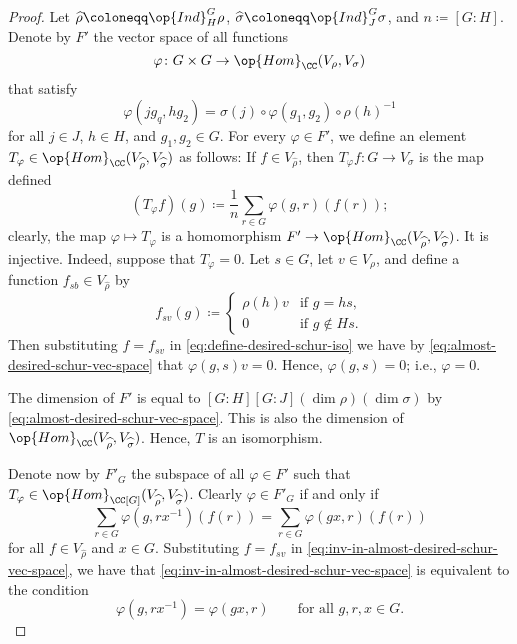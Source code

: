 \documentclass[../main.tex]{subfiles}
\begin{document}
\begin{proof}
	Let $\widehat\rho\coloneqq\op{Ind}^G_H\rho$, $\widehat\sigma\coloneqq\op{Ind}^G_J\sigma$, and $n\coloneqq[G:H]$. Denote by $F'$ the vector space of all functions
	\[\varphi\colon G\times G\to\op{Hom}_\CC(V_\rho,V_\sigma)\]
	that satisfy
	\begin{equation}
		\varphi(jg_q,hg_2) = \sigma(j)\circ\varphi(g_1,g_2)\circ\rho(h)^{-1} \label{eq:almost-desired-schur-vec-space}
	\end{equation}
	for all $j\in J$, $h\in H$, and $g_1,g_2\in G$. For every $\varphi\in F'$, we define an element $T_\varphi\in\op{Hom}_\CC(V_{\widehat\rho},V_{\widehat\sigma})$ as follows: If $f\in V_{\widehat\rho}$, then $T_\varphi f\colon G\to V_\sigma$ is the map defined
	\begin{equation}
		(T_\varphi f)(g)\coloneqq\frac1n\sum_{r\in G}\varphi(g,r)(f(r)); \label{eq:define-desired-schur-iso}
	\end{equation}
	clearly, the map $\varphi\mapsto T_\varphi$ is a homomorphism $F'\to\op{Hom}_\CC(V_{\widehat\rho},V_{\widehat\sigma})$. It is injective. Indeed, suppose that $T_\varphi=0$. Let $s\in G$, let $v\in V_\rho$, and define a function $f_{sb}\in V_{\widehat\rho}$ by
	\[f_{sv}(g)\coloneqq\begin{cases}
		\rho(h)v & \text{if }g=hs, \\
		0 & \text{if }g\notin Hs.
	\end{cases}\]
	Then substituting $f=f_{sv}$ in \eqref{eq:define-desired-schur-iso} we have by \eqref{eq:almost-desired-schur-vec-space} that $\varphi(g,s)v=0$. Hence, $\varphi(g,s)=0$; i.e., $\varphi=0$.

	The dimension of $F'$ is equal to $[G:H][G:J](\dim\rho)(\dim\sigma)$ by \eqref{eq:almost-desired-schur-vec-space}. This is also the dimension of $\op{Hom}_\CC(V_{\widehat\rho},V_{\widehat\sigma})$. Hence, $T$ is an isomorphism.

	Denote now by $F'_G$ the subspace of all $\varphi\in F'$ such that $T_\varphi\in\op{Hom}_{\CC[G]}(V_{\widehat\rho},V_{\widehat\sigma})$. Clearly $\varphi\in F'_G$ if and only if
	\begin{equation}
		\sum_{r\in G}\varphi\left(g,rx^{-1}\right)(f(r))=\sum_{r\in G}\varphi(gx,r)(f(r)) \label{eq:inv-in-almost-desired-schur-vec-space}
	\end{equation}
	for all $f\in V_{\widehat\rho}$ and $x\in G$. Substituting $f=f_{sv}$ in \eqref{eq:inv-in-almost-desired-schur-vec-space}, we have that \eqref{eq:inv-in-almost-desired-schur-vec-space} is equivalent to the condition
	\begin{equation}
		\varphi\left(g,rx^{-1}\right)=\varphi(gx,r)\qquad\text{for all }g,r,x\in G. \label{eq:better-inv-in-almost-desired-schur-vec-space}
	\end{equation}


\end{proof}
\end{document}
